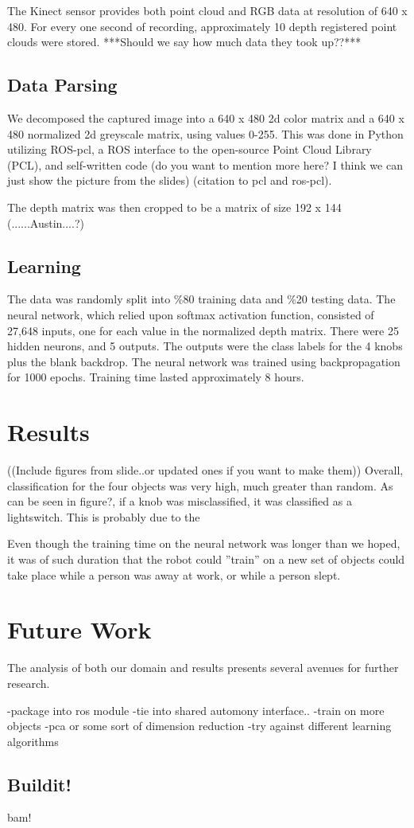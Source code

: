 \documentclass{article}
\begin{document}
The Kinect sensor provides both point cloud and RGB data at resolution of 640 x 480. For every one second of recording, approximately 10 depth registered point clouds were stored.  ***Should we say how much data they took up??***

\subsection{Data Parsing}
We decomposed the captured image into a 640 x 480 2d color matrix and a 640 x 480 normalized 2d greyscale matrix, using values 0-255. This was done in Python utilizing ROS-pcl, a ROS interface to the open-source Point Cloud Library (PCL), and self-written code (do you want to mention more here? I think we can just show the picture from the slides) (citation to pcl and ros-pcl).

The depth matrix was then cropped to be a matrix of size 192 x 144 (......Austin....?)

\subsection{Learning}
The data was randomly split into \%80 training data and \%20 testing data. The neural network, which relied upon softmax activation function, consisted of 27,648 inputs, one for each value in the normalized depth matrix.  There were 25 hidden neurons, and 5 outputs. The outputs were the class labels for the 4 knobs plus the blank backdrop.  The neural network was trained using backpropagation for 1000 epochs. Training time lasted approximately 8 hours.

\section{Results}
((Include figures from slide..or updated ones if you want to make them))
Overall, classification for the four objects was very high, much greater than random. As can be seen in figure?, if a knob was misclassified, it was classified as a lightswitch. This is probably due to the 

Even though the training time on the neural network was longer than we hoped, it was of such duration that the robot could ''train'' on a new set of objects could take place while a person was away at work, or while a person slept.

\section{Future Work}
The analysis of both our domain and results presents several avenues for further research.

-package into ros module
-tie into shared automony interface..
-train on more objects
-pca or some sort of dimension reduction
-try against different learning algorithms

\subsection{Buildit!}
bam!



\end{document}
